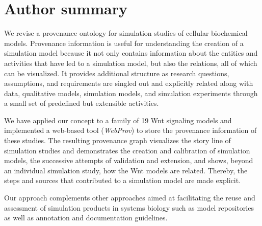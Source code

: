 \documentclass[10pt,letterpaper]{article}
\newcommand{\webprov}{\textit{WebProv}}
\newcommand{\wnt}{Wnt}
\begin{document}


\section*{Author summary}

We revise a provenance ontology for simulation studies of cellular biochemical models.
Provenance information is useful for understanding the creation of a simulation model because it not only contains information about the entities and activities that have led to a simulation model, but also the relations, all of which can be visualized.
It provides additional structure as research questions, assumptions, and requirements are singled out and explicitly related along with data, qualitative models, simulation models, and simulation experiments through a small set of predefined but extensible activities.

We have applied our concept to a family of 19 \wnt{} signaling models and implemented a web-based tool (\webprov{}) to store the provenance information of these studies.
The resulting provenance graph visualizes the story line of simulation studies and demonstrates the creation and calibration of simulation models, the successive attempts of validation and extension, and shows, beyond an individual simulation study, how the \wnt{} models are related.
Thereby, the steps and sources that contributed to a simulation model are made explicit.

Our approach complements other approaches aimed at facilitating the reuse and assessment of simulation products in systems biology such as model repositories as well as annotation and documentation guidelines.



\linenumbers



\end{document}
